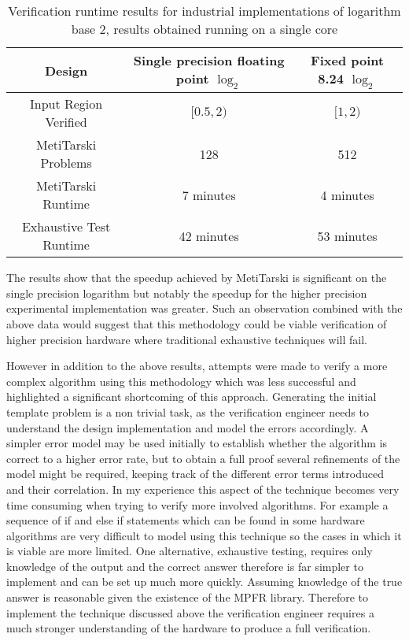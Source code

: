 \documentclass[a4]{article}
\begin{document}
\begin{center}
\begin{table}[h!]
\centering
\begin{tabular}{ |c|c|c| } 
\hline
 Design & Single precision floating point $\log_2$ & Fixed point 8.24 $\log_2$    \\
\hline
 Input Region Verified& $[0.5,2)$ & $[1,2) $ \\ 
 \hline 
 MetiTarski Problems & 128 & 512 \\
 \hline
 MetiTarski Runtime &  7 minutes & 4 minutes \\ 
 \hline
 Exhaustive Test Runtime & 42 minutes & 53 minutes \\ 
\hline
\end{tabular}
\caption{Verification runtime results for industrial implementations of logarithm base 2, results obtained running on a single core}
\label{result}
\end{table}
\end{center}
The results show that the speedup achieved by MetiTarski is significant on the single precision logarithm but notably the speedup for the higher precision experimental implementation was greater. Such an observation combined with the above data would suggest that this methodology could be viable verification of higher precision hardware where traditional exhaustive techniques will fail. 

However in addition to the above results, attempts were made to verify a more complex algorithm using this methodology which was less successful and highlighted a significant shortcoming of this approach. Generating the initial template problem is a non trivial task, as the verification engineer needs to understand the design implementation and model the errors accordingly. A simpler error model may be used initially to establish whether the algorithm is correct to a higher error rate, but to obtain a full proof several refinements of the model might be required, keeping track of the different error terms introduced and their correlation. In my experience this aspect of the technique becomes very time consuming when trying to verify more involved algorithms. For example a sequence of if and else if statements which can be found in some hardware algorithms are very difficult to model using this technique so the cases in which it is viable are more limited. One alternative, exhaustive testing, requires only knowledge of the output and the correct answer therefore is far simpler to implement and can be set up much more quickly. Assuming knowledge of the true answer is reasonable given the existence of the MPFR library. Therefore to implement the technique discussed above the verification engineer requires a much stronger understanding of the hardware to produce a full verification. 
\end{document}
